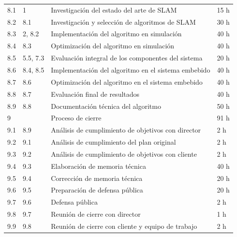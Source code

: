 \documentclass[
11pt, %
codirector, %
]{charter}
\begin{document}
\begin{table}[htpb]
\begin{tabular}{@{}llll@{}}
8.1             & 1                    & Investigación del estado del arte de SLAM          & 15 h               \\
8.2             & 8.1                  & Investigación y selección de algoritmos de SLAM    & 30 h               \\
8.3             & 2, 8.2               & Implementación del algoritmo en simulación         & 40 h               \\
8.4             & 8.3                  & Optimización del algoritmo en simulación           & 40 h               \\
8.5             & 5.5, 7.3             & Evaluación integral de los componentes del sistema & 20 h               \\
8.6             & 8.4, 8.5             & Implementación del algoritmo en el sistema embebido  & 40 h               \\
8.7             & 8.6                  & Optimización del algoritmo en el sistema embebido  & 40 h               \\
8.8             & 8.7                  & Evaluación final de resultados                     & 40 h               \\
8.9             & 8.8                  & Documentación técnica del algoritmo                & 50 h               \\
9               &                      & Proceso de cierre                                  & 91 h               \\ 
9.1             & 8.9                  & Análisis de cumplimiento de objetivos con director & 2 h                \\ 
9.2             & 9.1                  & Análisis de cumplimiento del plan original         & 2 h                \\ 
9.3             & 9.2                  & Análisis de cumplimiento de objetivos con cliente  & 2 h                \\ 
9.4             & 9.3                  & Elaboración de memoria técnica                     & 40 h               \\ 
9.5             & 9.4                  & Corrección de memoria técnica                      & 20 h               \\
9.6             & 9.5                  & Preparación de defensa pública                     & 20 h               \\
9.7             & 9.6                  & Defensa pública                                    & 2 h                \\
9.8             & 9.7                  & Reunión de cierre con director                     & 1 h                \\
9.9             & 9.8                  & Reunión de cierre con cliente y equipo de trabajo  & 2 h                \\ \bottomrule
\end{tabular}
\end{table}
\end{document}

